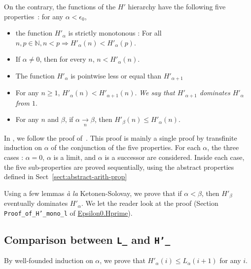 


On the contrary, the functions of the $H'$ hierarchy have the following five properties~\cite{KS81}: for any $\alpha < \epsilon_0$,
\begin{itemize}
\item the function $H'_\alpha$ is strictly monotonous :
      For all $n,p \in\mathbb{N}, n < p \Rightarrow H'_\alpha(n)< H'_\alpha(p)$.
\item If $\alpha \not= 0$, then for every $n$, $n<H'_\alpha(n)$.
\item The function $H'_\alpha$ is pointwise less or equal than $H'_{\alpha+1}$

\item For any $n\geq 1$, $H'_\alpha(n)<H'_{\alpha+1}(n)$.
\emph{We say that $H'_{\alpha+1}$ dominates $H'_\alpha$ from $1$}.
\item For any $n$ and $\beta$, if $\alpha \xrightarrow[n]{} \beta$, then
$H'_\beta(n)\leq H'_\alpha(n)$.
\end{itemize}





In \coq{}, we follow the  proof of~\cite{KS81}. This proof is mainly a single  proof by transfinite induction on $\alpha$ of the conjunction of the five properties.
For each $\alpha$, the three cases : $\alpha=0$, $\alpha$ is a limit, and 
$\alpha$ is a successor are considered. Inside each case, the five sub-properties are proved sequentially, using the abstract properties defined in Sect~\vref{sect:abstract-arith-prop}




Using a few lemmas \emph{à la} Ketonen-Solovay, we prove that
if $\alpha<\beta$, then $H'_\beta$ eventually dominates
$H'_\alpha$.
We let the reader look at the proof (Section \texttt{Proof\_of\_H'\_mono\_l} of \href{../theories/html/hydras.Epsilon0.Hprime.html\#H_}{Epsilon0.Hprime}).

\noindent


\subsection{Comparison between \texttt{L\_} and \texttt{H'\_} }

By well-founded induction on $\alpha$, we prove that
 $H'_\alpha(i) \leq L_\alpha(i+1)$ for any $i$.


